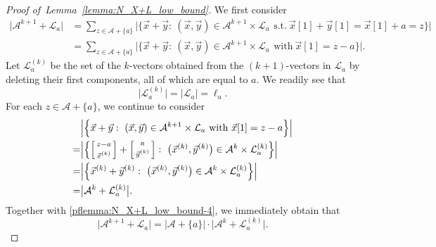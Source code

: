 \documentclass[11pt,draftclsnofoot,onecolumn]{IEEEtran}
\begin{document}
\begin{proof}[Proof of~Lemma~\ref{lemma:N_X+L_low_bound}]
  We first consider
\begin{align}
\big|\mathcal{A}^{k+1}+\mathcal{L}_{a}\big|&=\sum_{z\in\mathcal{A}+\{a\}}\Big|\Big\{\vec{x}+\vec{y}:~
(\vec{x},\vec{y})\in\mathcal{A}^{k+1}\times\mathcal{L}_{a}\,~
\text{s.t.}~\vec{x}[1]+\vec{y}[1]=\vec{x}[1]+a=z\Big\}\Big|\nonumber\\
&=\sum_{z\in\mathcal{A}+\{a\}}\Big|\Big\{\vec{x}+\vec{y}:~
(\vec{x},\vec{y})\in\mathcal{A}^{k+1}\times\mathcal{L}_{a}\,~
\text{with}~\vec{x}[1]=z-a\Big\}\Big|.
\label{pflemma:N_X+L_low_bound-4}
\end{align}
Let $\mathcal{L}_{a}^{(k)}$ be the set of the $k$-vectors obtained from the $(k+1)$-vectors in $\mathcal{L}_{a}$ by deleting their first components, all of which are equal to $a$. We readily see that
\begin{equation}
\big|\mathcal{L}_{a}^{(k)}\big|=|\mathcal{L}_{a}|=\ell_{a}.\label{pf:N_lemma:recur_ineq_4.0}
\end{equation}
For each $z\in\mathcal{A}+\{a\}$, we continue to consider
\begin{align}
&\Big|\Big\{\vec{x}+\vec{y}:~
(\vec{x},\vec{y})\in\mathcal{A}^{k+1}\times\mathcal{L}_{a}~
\text{with}~\vec{x}[1]=z-a\Big\}\Big|\nonumber\\
=&\Big|\Big\{\Big[\begin{smallmatrix}z-a  \vspace{1mm} \\\vec{x}^{(k)}\end{smallmatrix}\Big]+
\Big[\begin{smallmatrix}a \vspace{1mm} \\\vec{y}^{(k)}\end{smallmatrix}\Big]:~
\big(\vec{x}^{(k)},\vec{y}^{(k)}\big)\in\mathcal{A}^{k}\times\mathcal{L}^{(k)}_{a}\Big\}\Big|\nonumber\\
=&\Big|\Big\{\vec{x}^{(k)}+\vec{y}^{(k)}:
~\big(\vec{x}^{(k)},\vec{y}^{(k)}\big)\in\mathcal{A}^{k}\times\mathcal{L}^{(k)}_{a}\Big\}\Big|\nonumber\\
=&\big|\mathcal{A}^{k}+\mathcal{L}^{(k)}_{a}\big|.\nonumber%
\end{align}
Together with \eqref{pflemma:N_X+L_low_bound-4}, we immediately obtain that
\begin{equation}
\big|\mathcal{A}^{k+1}+\mathcal{L}_{a}\big|=\big|\mathcal{A}+\{a\}\big|\cdot \big|\mathcal{A}^k+\mathcal{L}_a^{(k)}\big|.\label{pflemma:N_X+L_low_bound-5.1}
\end{equation}



\end{proof}
\end{document}
